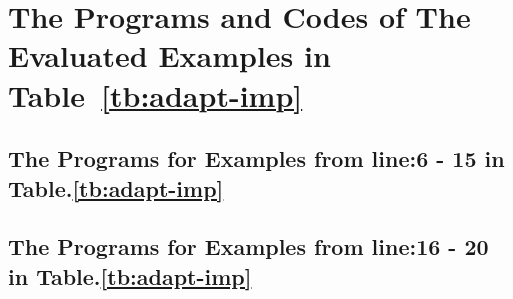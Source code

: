 \section{The Programs and Codes of The Evaluated Examples in Table~\ref{tb:adapt-imp}}
\label{apdx:evaluated_examples}
\subsection{The Programs for Examples from line:6 - 15 in Table.\ref{tb:adapt-imp}}


\subsection{The Programs for Examples from line:16 - 20 in Table.\ref{tb:adapt-imp}}
